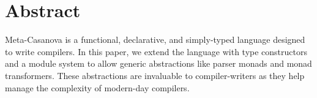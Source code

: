 \section*{Abstract}
Meta-Casanova is a functional, declarative, and simply-typed language designed to write compilers.
In this paper, we extend the language with type constructors and a module system to allow generic abstractions like parser monads and monad transformers. These abstractions are invaluable to compiler-writers as they help manage the complexity of modern-day compilers.
